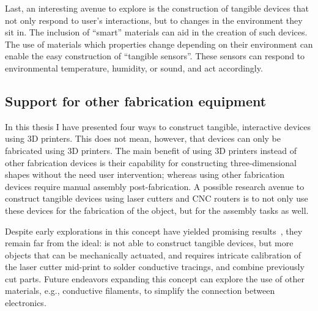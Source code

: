       Last, an interesting avenue to explore is the construction of tangible
      devices that not only respond to user's interactions, but to changes in
      the environment they sit in. The inclusion of ``smart'' materials can aid
      in the creation of such devices. The use of materials which properties
      change depending on their environment can enable the easy construction of
      ``tangible sensors''. These sensors can respond to environmental
      temperature, humidity, or sound, and act accordingly.

    \subsection{Support for other fabrication equipment}
      In this thesis I have presented four \pap ways to construct tangible,
      interactive devices using 3D printers. This does not mean, however, that
      \pap devices can only be fabricated using 3D printers. The main benefit of
      using 3D printers instead of other fabrication devices is their capability
      for constructing three-dimensional shapes without the need user
      intervention; whereas using other fabrication devices require manual
      assembly post-fabrication. A possible research avenue to construct
      tangible devices using laser cutters and CNC routers is to not only use
      these devices for the fabrication of the object, but for the assembly
      tasks as well.

      Despite early explorations in this concept have yielded promising
      results~\cite{Katakura:2019, Nisser:2021}, they remain far from the \papf
      ideal: \cite{Katakura:2019} is not able to construct tangible devices, but
      more objects that can be mechanically actuated, and \cite{Nisser:2021}
      requires intricate calibration of the laser cutter mid-print to solder
      conductive tracings, and combine previously cut parts. Future endeavors
      expanding this concept can explore the use of other materials, e.g.,
      conductive filaments, to simplify the connection between electronics.